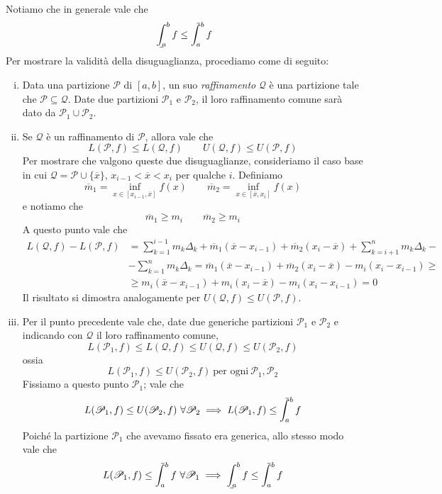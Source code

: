 \begin{remark}
    Notiamo che in generale vale che
    \[
    \bint_a^b f \le \aint_a^b f
    \]
    Per mostrare la validità della disuguaglianza, procediamo come di seguito:
    \begin{enumerate}[(i)]
        \item Data una partizione $\mathscr{P}$ di $[a,b]$, un suo \emph{raffinamento} $\mathscr{Q}$ è una partizione tale che $\mathscr{P}\subseteq \mathscr{Q}$. Date due partizioni $\mathscr{P}_1$ e $\mathscr{P}_2$, il loro raffinamento comune sarà dato da $\mathscr{P}_1 \cup \mathscr{P}_2$.
        \item Se $\mathscr{Q}$ è un raffinamento di $\mathscr{P}$, allora vale che
        \[
        L(\mathscr{P}, f) \le L(\mathscr{Q},f) \qquad U(\mathscr{Q},f)\le U(\mathscr{P},f)
        \]
        Per mostrare che valgono queste due disuguaglianze, consideriamo il caso base in cui $\mathscr{Q} = \mathscr{P} \cup \{\overline{x}\}$, $x_{i-1} < \overline{x}<x_i$ per qualche $i$. Definiamo
        \[
        \overline{m}_1 = \inf_{x\in[x_{i-1}, \overline{x}]}f(x) \qquad \overline{m}_2 = \inf_{x\in[\overline{x}, x_i]}f(x)
        \]
        e notiamo che
        \[
        \overline{m}_1 \ge m_i \qquad \overline{m}_2 \ge m_i
        \]
        A questo punto vale che
        \[
        \begin{split}
            L(\mathscr{Q}, f)-L(\mathscr{P},f) &= \sum_{k=1}^{i-1}m_k \Delta_k + \overline{m}_1 (\overline{x}-x_{i-1}) + \overline{m}_2 (x_i - \overline{x}) + \sum_{k=i+1}^n m_k \Delta_k - \\
            & -\sum_{k=1}^n m_k \Delta_k = \overline{m}_1 (\overline{x}-x_{i-1}) + \overline{m}_2 (x_i - \overline{x})-m_i(x_{i}-x_{i-1})\ge \\
            & \ge m_i(\overline{x}-x_{i-1}) + m_i (x_i -\overline{x})-m_i(x_i-x_{i-1}) = 0
        \end{split}
        \]
        Il risultato si dimostra analogamente per $U(\mathscr{Q}, f) \le U(\mathscr{P},f)$.
        \item Per il punto precedente vale che, date due generiche partizioni $\mathscr{P}_1$ e $\mathscr{P}_2$ e indicando con $\mathscr{Q}$ il loro raffinamento comune,
        \[
        L(\mathscr{P}_1, f)\le L(\mathscr{Q}, f) \le U(\mathscr{Q}, f)\le U(\mathscr{P}_2, f)
        \]
        ossia
       \begin{equation}
           \label{eq:8.5}
           L(\mathscr{P}_1, f)\le U(\mathscr{P}_2, f) \ \text{per ogni} \ \mathscr{P}_1, \mathscr{P}_2
       \end{equation}
       Fissiamo a questo punto $\mathscr{P}_1$; vale che
       \[
       L(\mathscr{P}_1, f)\le U(\mathscr{P}_2, f) \ \forall \mathscr{P}_2 \implies L(\mathscr{P}_1, f)\le \aint_a^b f
       \]
       Poiché la partizione $\mathscr{P}_1$ che avevamo fissato era generica, allo stesso modo vale che
       \[
       L(\mathscr{P}_1, f)\le \aint_a^b f \ \forall \mathscr{P}_1 \implies \bint_a^b f \le \aint_a^b f
       \]
    \end{enumerate}
\end{remark}
